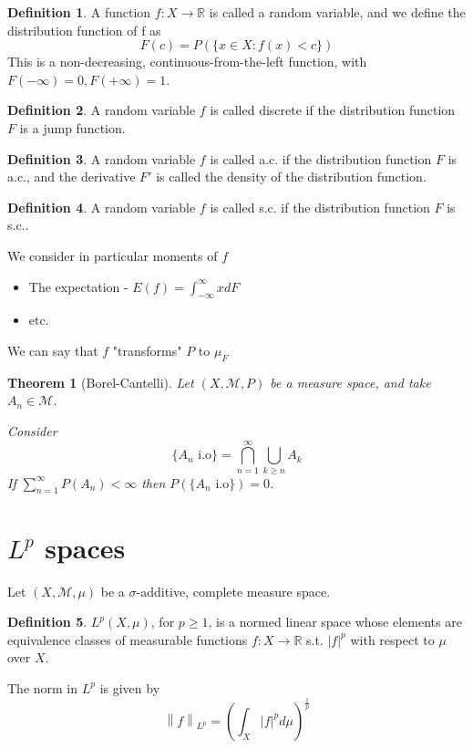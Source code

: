 \documentclass[11pt,a4paper]{report}
\theoremstyle{plain}
\newtheorem{thm}{Theorem}[section]
\theoremstyle{definition}
\newtheorem*{defn}{Definition}
\theoremstyle{remark}
\newcommand{\Union}{\bigcup}
\newcommand{\Intersection}{\bigcap}
\newcommand{\R}{\mathbb{R}}
\newcommand{\cM}{\mathcal{M}}
\newcommand{\abs}[1]{\left| #1 \right|}
\newcommand{\norm}[1]{\left\lVert #1 \right\rVert}
\begin{document}
\begin{defn}
  A function $f : X \to \R$ is called a random variable, and we define the distribution function of f as 
  $$ F(c) = P(\{ x \in X : f(x) < c\}) $$
  This is a non-decreasing, continuous-from-the-left function, with $F(-\infty) = 0, F(+\infty) = 1$.
\end{defn}

\begin{defn}
  A random variable $f$ is called discrete if the distribution function $F$ is a jump function.
\end{defn}

\begin{defn}
  A random variable $f$ is called a.c. if the distribution function $F$ is a.c., and the derivative $F'$ is called the density of the distribution function.
\end{defn}

\begin{defn}
  A random variable $f$ is called s.c. if the distribution function $F$ is s.c..
\end{defn}

We consider in particular moments of $f$
\begin{itemize}
    \item The expectation - $E(f) = \int_{-\infty}^\infty x dF$
    \item etc.
\end{itemize}

We can say that $f$ "transforms" $P$ to $\mu_F$

\begin{thm}[Borel-Cantelli]
  Let $(X, \cM, P)$ be a measure space, and take $A_n \in \cM$.
  
  Consider 
  $$ \{A_n \text{ i.o}\} = \Intersection_{n = 1}^\infty \Union_{k \ge n} A_k $$
  If $\sum_{n=1}^\infty P(A_n) < \infty$ then $P(\{A_n \text{ i.o}\}) = 0$.
\end{thm}

\section{$L^p$ spaces}

Let $(X, \cM, \mu)$ be a $\sigma$-additive, complete measure space.

\newcommand{\normlp}[1]{\norm{#1}_{L^p}}

\begin{defn}
  $L^p(X, \mu)$, for $p \ge 1$, is a normed linear space whose elements are equivalence classes of measurable functions $f: X \to \R$ s.t. $\abs{f}^p$ with respect to $\mu$ over $X$.
  
  The norm in $L^p$ is given by
  $$ \normlp{f} = \left(\int_X \abs{f}^p d\mu\right)^\frac{1}{p} $$
\end{defn}
\end{document}
